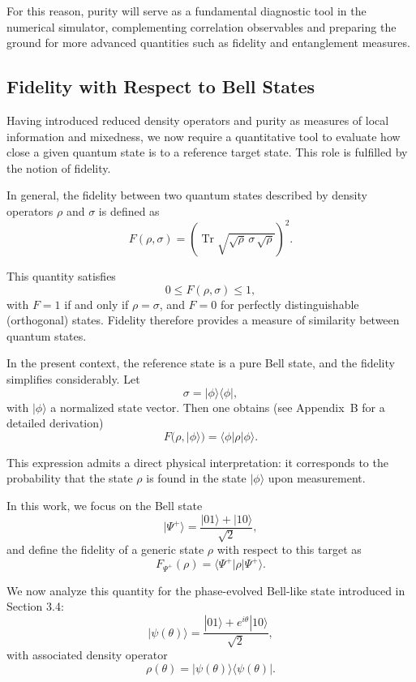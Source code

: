 \documentclass[a4paper]{article}
\begin{document}
For this reason, purity will serve as a fundamental diagnostic tool in the numerical simulator, complementing correlation observables and preparing the ground for more advanced quantities such as fidelity and entanglement measures.

\subsection{Fidelity with Respect to Bell States}

Having introduced reduced density operators and purity as measures of local information and mixedness, we now require a quantitative tool to evaluate how close a given quantum state is to a reference target state. This role is fulfilled by the notion of fidelity.

In general, the fidelity between two quantum states described by density operators $\rho$ and $\sigma$ is defined as
\[
F(\rho,\sigma)
=
\left(\operatorname{Tr}\sqrt{\sqrt{\rho}\,\sigma\,\sqrt{\rho}}\right)^2.
\]

This quantity satisfies
\[
0 \le F(\rho,\sigma) \le 1,
\]
with $F=1$ if and only if $\rho = \sigma$, and $F=0$ for perfectly distinguishable (orthogonal) states. Fidelity therefore provides a measure of similarity between quantum states.

\medskip

In the present context, the reference state is a pure Bell state, and the fidelity simplifies considerably. Let
\[
\sigma = |\phi\rangle\langle\phi|,
\]
with $|\phi\rangle$ a normalized state vector. Then one obtains (see Appendix~B for a detailed derivation)
\[
F(\rho, |\phi\rangle)
=
\langle \phi | \rho | \phi \rangle.
\]

This expression admits a direct physical interpretation: it corresponds to the probability that the state $\rho$ is found in the state $|\phi\rangle$ upon measurement.

\medskip

In this work, we focus on the Bell state
\[
|\Psi^+\rangle = \frac{|01\rangle + |10\rangle}{\sqrt{2}},
\]
and define the fidelity of a generic state $\rho$ with respect to this target as
\[
F_{\Psi^+}(\rho)
=
\langle \Psi^+ | \rho | \Psi^+ \rangle.
\]

\medskip

We now analyze this quantity for the phase-evolved Bell-like state introduced in Section 3.4:
\[
|\psi(\theta)\rangle = \frac{|01\rangle + e^{i\theta}|10\rangle}{\sqrt{2}},
\]
with associated density operator
\[
\rho(\theta) = |\psi(\theta)\rangle\langle\psi(\theta)|.
\]
\end{document}
